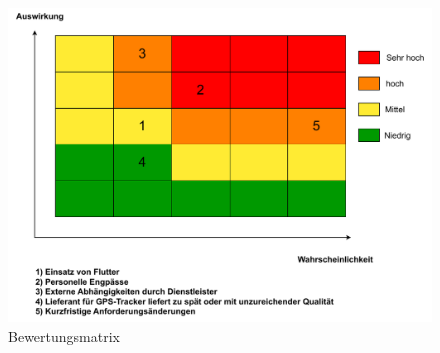 \begin{figure}[H]
    \centering
    \includegraphics[width = \textwidth]{pictures/Bewertungsmatrix}
    \caption{Bewertungsmatrix}
    \label{fig:bewertungsmatrix}
\end{figure}